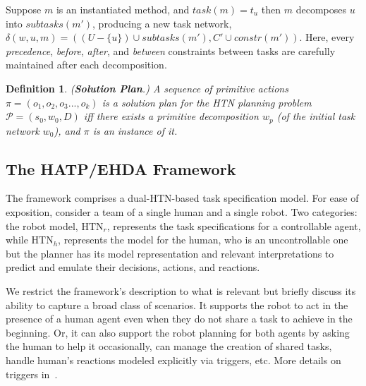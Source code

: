 \documentclass[letterpaper]{article} %
\newtheorem{definition}{Definition}
\begin{document}
Suppose $m$ is an instantiated method, and $task(m)=t_u$ then $m$ decomposes $u$ into $subtasks(m')$, producing a new task network, $\delta(w,u,m)=((U-\{u\})\cup subtasks(m'),C'\cup constr(m'))$.
Here, every \textit{precedence}, \textit{before}, \textit{after}, and \textit{between} constraints between tasks are carefully maintained after each decomposition.

\begin{definition} 
(\textbf{Solution Plan}.) 
{A sequence of primitive actions $\pi=(o_1,o_2,o_3...,o_k)$ is a solution plan for the HTN planning problem $\mathcal{P}=(s_0,w_0,D)$ iff there exists a primitive decomposition $w_p$ (of the initial task network $w_0$), and $\pi$ is an instance of it. 
}  
\label{def:htn-sol-plan}
\end{definition}

\subsection{The HATP/EHDA Framework}
The framework comprises a dual-HTN-based task specification model.   
For ease of exposition, consider a team of a single human and a single robot. Two categories: the robot model, $\mathrm{HTN}_{r}$, represents the task specifications for a controllable agent, while $\mathrm{HTN}_{h}$, represents the model for the human, who is an uncontrollable one but the planner has its model
representation and relevant interpretations to predict and emulate their decisions, actions, and reactions. 


We restrict the framework's description to what is relevant but briefly discuss its ability to capture a broad class of scenarios. It supports the robot to act in the presence of a human agent even when they do not share a task to achieve in the beginning. Or, it can also support the robot planning for both agents by asking the human to help it occasionally, can manage the creation of shared tasks, handle human's reactions modeled explicitly via triggers, etc. More details on triggers  in~\cite{ingrand1996prs,AlamiCFGI98}.   
\end{document}
